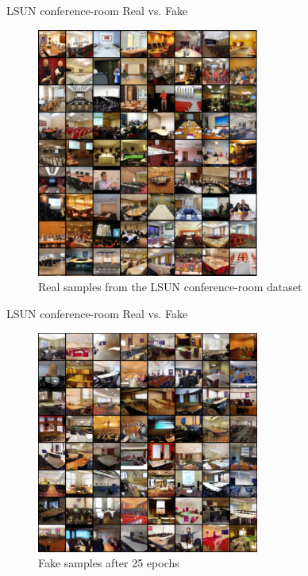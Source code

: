 \documentclass[10pt]{beamer}
\begin{document}
{
\begin{frame}{LSUN conference-room Real vs. Fake}
\begin{figure}[htbp] 
  \centering
     \includegraphics[width=0.65\textwidth,height=0.65\textwidth]{pic/lsun_real.PNG}
  \caption{Real samples from the LSUN conference-room dataset }
  \label{fig:Bild1}
\end{figure}
\end{frame}
}

{
\begin{frame}{LSUN conference-room Real vs. Fake}
\begin{figure}[htbp] 
  \centering
     \includegraphics[width=0.65\textwidth,height=0.65\textwidth]{pic/lsun_fake.PNG}
  \caption{Fake samples after 25 epochs }
  \label{fig:Bild1}
\end{figure}
\end{frame}
}
\end{document}
